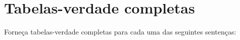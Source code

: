

\chapter{Tabelas-verdade completas}\label{s:CompleteTruthTables}
\setcounter{ProbPart}{0}

\problempart
\label{pr.TT.TTorC}
Forneça tabelas-verdade completas para cada uma das seguintes sentenças:
